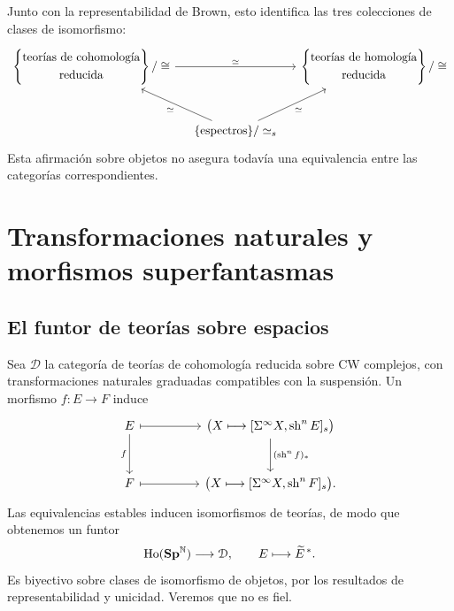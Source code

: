 Junto con la representabilidad de Brown, esto identifica las tres colecciones de clases de isomorfismo:
\[
\begin{tikzcd}[column sep=small,row sep=large]
\left\{\begin{gathered}\text{teorías de cohomología}\\\text{reducida}\end{gathered}\right\}/\cong
\arrow[rr,"\simeq"]
&&\left\{\begin{gathered}\text{teorías de homología}\\\text{reducida}\end{gathered}\right\}/\cong\\
&\{\text{espectros}\}/\simeq_s
\arrow[ul,"\simeq"]\arrow[ur,"\simeq"']&
\end{tikzcd}
\]
Esta afirmación sobre objetos no asegura todavía una equivalencia entre las categorías correspondientes.

\section{Transformaciones naturales y morfismos superfantasmas}

\subsection{El funtor de teorías sobre espacios}
Sea $\mathcal D$ la categoría de teorías de cohomología reducida sobre CW complejos, con transformaciones naturales graduadas compatibles con la suspensión. Un morfismo $f\colon E\to F$ induce
\[
\begin{tikzcd}[column sep=huge,row sep=large]
E\arrow[d,"f"']\arrow[r,mapsto]&
\bigl(X\longmapsto[\Sigma^\infty X,\sh^nE]_s\bigr)
\arrow[d,"(\sh^nf)_*"]\\
F\arrow[r,mapsto]&
\bigl(X\longmapsto[\Sigma^\infty X,\sh^nF]_s\bigr).
\end{tikzcd}
\]
Las equivalencias estables inducen isomorfismos de teorías, de modo que obtenemos un funtor
\[
\operatorname{Ho}(\mathbf{Sp}^{\mathbb N})\longrightarrow\mathcal D,
\qquad E\longmapsto\widetilde E^{\,*}.
\]
Es biyectivo sobre clases de isomorfismo de objetos, por los resultados de representabilidad y unicidad. Veremos que no es fiel.

